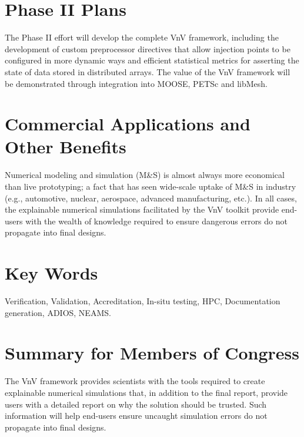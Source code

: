 \section*{Phase II Plans}
The Phase II effort will develop the complete VnV framework, including the development
of custom preprocessor directives that allow injection points to be configured in more dynamic ways 
and efficient statistical metrics for asserting the state of data 
stored in distributed arrays. The value of the VnV framework will be demonstrated through integration
into MOOSE, PETSc and libMesh. 

\section*{Commercial Applications and Other Benefits}
Numerical modeling and simulation (M\&S) is almost always more economical than live prototyping; 
a fact that has seen wide-scale uptake of M\&S in industry (e.g., automotive, nuclear, 
aerospace, advanced manufacturing, etc.). In all cases, the explainable numerical simulations facilitated
by the VnV toolkit provide end-users with the wealth of knowledge required to ensure dangerous errors
do not propagate into final designs. 

\section*{Key Words}
Verification, Validation, Accreditation, In-situ testing,
HPC, Documentation generation, ADIOS, NEAMS.

\section*{Summary for Members of Congress}
The VnV framework provides scientists with the tools required 
to create explainable numerical simulations that, in addition to the final report, provide
users with a detailed report on why the solution should be trusted. Such information will
help end-users ensure uncaught simulation errors do not propagate into final designs. 
